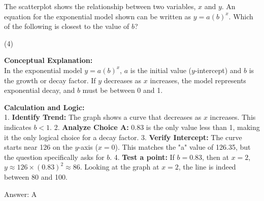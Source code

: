 \documentclass[11pt,paper=a4,answers]{exam}
\begin{document}
\begin{questions}
\question
\begin{center}
\end{center}
The scatterplot shows the relationship between two variables, $x$ and $y$. An equation for the exponential model shown can be written as $y = a(b)^x$. Which of the following is closest to the value of $b$?
\begin{tasks}(4)
\end{tasks}

\begin{solution}
\textbf{Conceptual Explanation:} \\
In the exponential model $y = a(b)^x$, $a$ is the initial value ($y$-intercept) and $b$ is the growth or decay factor. If $y$ decreases as $x$ increases, the model represents exponential decay, and $b$ must be between 0 and 1.

\vspace{30pt}

\textbf{Calculation and Logic:} \\
1. \textbf{Identify Trend:} The graph shows a curve that decreases as $x$ increases. This indicates $b < 1$.
2. \textbf{Analyze Choice A:} $0.83$ is the only value less than 1, making it the only logical choice for a decay factor.
3. \textbf{Verify Intercept:} The curve starts near 126 on the $y$-axis ($x=0$). This matches the "a" value of 126.35, but the question specifically asks for $b$.
4. \textbf{Test a point:} If $b = 0.83$, then at $x=2$, $y \approx 126 \times (0.83)^2 \approx 86$. Looking at the graph at $x=2$, the line is indeed between 80 and 100.

\vspace{30pt}

Answer: \colorbox{yellow!100}{A}
\end{solution}


\end{questions}
\end{document}
